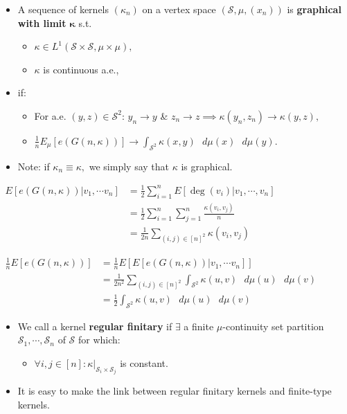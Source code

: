 \documentclass[
  letterpaper,
  DIV=11,
  numbers=noendperiod]{scrartcl}
\providecommand{\tightlist}{%
  \setlength{\itemsep}{0pt}\setlength{\parskip}{0pt}}\usepackage{longtable,booktabs,array}
\begin{document}
\begin{itemize}
\item
  A sequence of kernels \((\kappa_n)\) on a vertex space
  \((\mathcal{S}, \mu, (x_n))\) is \textbf{graphical} \textbf{with
  limit} \(\boldsymbol{\kappa}\) s.t.

  \begin{itemize}
  \item
    \(\kappa\in L^1(\mathcal{S}\times \mathcal{S}, \mu \times \mu),\)
  \item
    \(\kappa\) is continuous a.e.,
  \end{itemize}
\item
  if:

  \begin{itemize}
  \item
    For a.e. \((y, z) \in \mathcal{S}^2\): \(y_n \to y\) \&
    \(z_n \to z \implies \kappa(y_n, z_n) \to \kappa(y, z),\)
  \item
    \(\frac{1}{n} E_{\mu}[e(G(n, \kappa))] \to \int_{\mathcal{S}^2} \kappa(x, y) \text{ } d \mu(x) \text{ } d \mu(y).\)
  \end{itemize}
\item
  Note: if \(\kappa_n \equiv \kappa,\) we simply say that \(\kappa\) is
  graphical.
\end{itemize}

\(\begin{align}
E[e(G(n, \kappa))|v_1, \cdots v_n]
&= \frac{1}{2} \sum_{i=1}^n E[\deg(v_i)|v_1, \cdots, v_n] \\
&= \frac{1}{2} \sum_{i=1}^n \sum_{j=1}^n \frac{\kappa(v_i, v_j)}{n} \\
&= \frac{1}{2n} \sum_{(i,j) \in [n]^2} \kappa(v_i, v_j)
\end{align}\)

\(\begin{align}
\frac{1}{n} E[e(G(n, \kappa))]
&= \frac{1}{n} E[E[e(G(n, \kappa))|v_1, \cdots v_n]] \\
&= \frac{1}{2n^2} \sum_{(i,j) \in [n]^2} \int_{\mathcal{S}^2} \kappa(u, v) \text{ } d\mu(u) \text{ } d\mu(v) \\
&= \frac{1}{2} \int_{\mathcal{S}^2} \kappa(u, v) \text{ } d\mu(u) \text{ } d\mu(v)
\end{align}\)

\begin{itemize}
\item
  We call a kernel \textbf{regular finitary} if \(\exists\) a finite
  \(\mu\)-continuity set partition
  \(\mathcal{S}_1, \cdots, \mathcal{S}_n\) of \(\mathcal{S}\) for which:

  \begin{itemize}
  \tightlist
  \item
    \(\forall i, j \in [n]:\kappa|_{\mathcal{S}_i \times \mathcal{S}_j}\)
    is constant.
  \end{itemize}
\item
  It is easy to make the link between regular finitary kernels and
  finite-type kernels.
\end{itemize}
\end{document}
